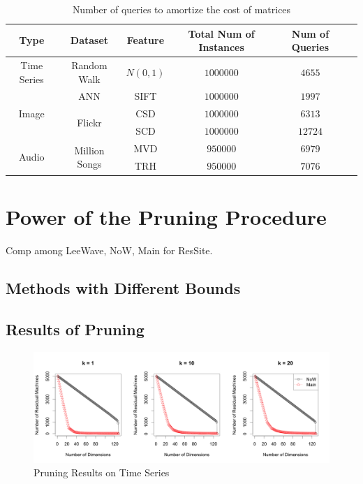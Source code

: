 \begin{table}[H]\begin{center}
\caption{Number of queries to amortize the cost of matrices}\label{table:amortize}
\begin{tabular}{|c|c|c|c|c|c|}
\hline 
Type & Dataset & Feature & Total Num of Instances & Num of Queries\\ \hline \hline
Time Series & Random Walk & $N(0,1)$ & $1000000$ & $4655$\\ \hline
\multirow{3}{*}{Image} & ANN & SIFT & $1000000$ & $1997$\\ 
\cline{2-5}
 & \multirow{2}{*}{Flickr} & CSD & $1000000$ & $6313$\\ 
 \cline{3-5}
 & & SCD &  $1000000$ & $12724$\\ \hline
 \multirow{2}{*}{Audio} & \multirow{2}{*}{Million Songs} & MVD & $950000$ & $6979$\\ 
 \cline{3-5}
 & & TRH & $950000$ & $7076$\\ \hline
\end{tabular}
\end{center}\end{table}





\section{Power of the Pruning Procedure} %
\label{s:power_of_the_pruning_procedure}

Comp among LeeWave, NoW, Main for ResSite.


\subsection{Methods with Different Bounds} %
\label{sub:methods_with_different_bounds}



\subsection{Results of Pruning} %
\label{sub:results_of_pruning}
	
\begin{figure}[htpb!]
  \centering
  \includegraphics[width=1.0\linewidth]{exp/prune/time.png}
  \caption{Pruning Results on Time Series}
  \label{fig:prune_time}
\end{figure}

